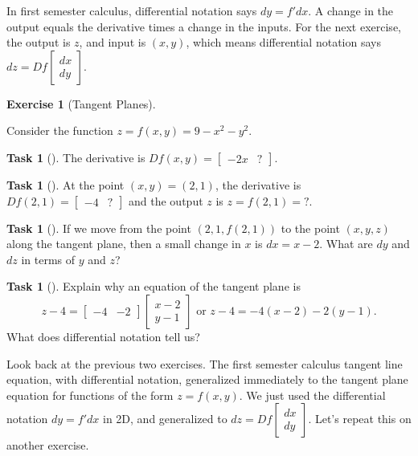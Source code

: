 \documentclass[10pt,]{book}
\theoremstyle{plain}
\theoremstyle{definition}
\theoremstyle{definition}
\theoremstyle{definition}
\theoremstyle{definition}
\newtheorem{exploration}[project]{Exercise}
\newtheorem{task}[project]{Task}
\theoremstyle{definition}
\numberwithin{equation}{section}
\newcommand{\amp}{&}
\begin{document}
In first semester calculus, differential notation says \(dy=f' dx\). A change in the output equals the derivative times a change in the inputs. For the next exercise, the output is \(z\), and input is \((x,y)\), which means differential notation says \(dz = Df \begin{bmatrix}dx\\dy
\end{bmatrix}\).%
\begin{exploration}[Tangent Planes]\label{prob_tangent_plane_downbowl}
%
\par
%
\par
Consider the function \(z=f(x,y)=9-x^2-y^2\).%
\begin{task}[]\label{task-319}
The derivative is \(Df(x,y) = \begin{bmatrix}-2x\amp ?
\end{bmatrix}\).%
\end{task}
\begin{task}[]\label{task-320}
At the point \((x,y)=(2,1)\), the derivative is \(Df(2,1) = \begin{bmatrix}-4\amp ?
\end{bmatrix}\) and the output \(z\) is \(z=f(2,1)=?\).%
\end{task}
\begin{task}[]\label{task-321}
If we move from the point \((2,1,f(2,1))\) to the point \((x,y,z)\) along the tangent plane, then a small change in \(x\) is \(dx=x-2\). What are \(dy\) and \(dz\) in terms of \(y\) and \(z\)?%
\end{task}
\begin{task}[]\label{task-322}
Explain why an equation of the tangent plane is  %
\begin{equation*}
z-4=\begin{bmatrix}-4 \amp  -2
\end{bmatrix} \begin{bmatrix}x-2\\y-1
\end{bmatrix}  
\text{ or }  
z-4=-4(x-2)-2(y-1).
\end{equation*}
What does differential notation tell us?%
%
\end{task}
\end{exploration}
Look back at the previous two exercises. The first semester calculus tangent line equation, with differential notation, generalized immediately to the tangent plane equation for functions of the form \(z=f(x,y)\). We just used the differential notation \(dy=f'dx\) in 2D, and generalized to \(dz = Df \begin{bmatrix}dx\\dy
\end{bmatrix}\). Let's repeat this on another exercise.%
\end{document}
